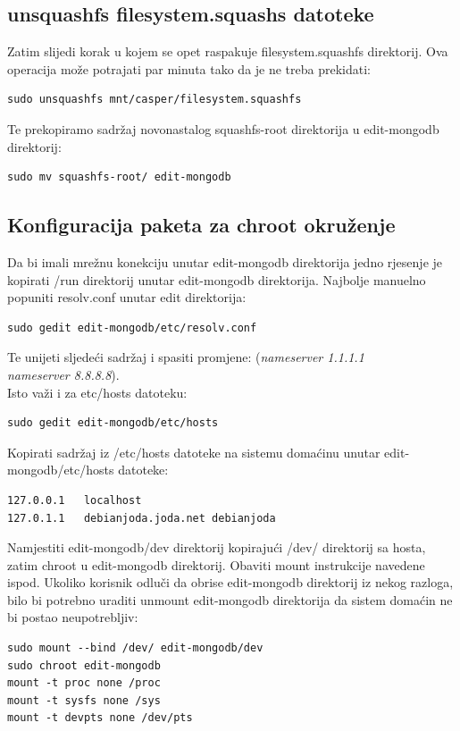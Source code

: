 \documentclass[12pt,vi]{mitthesis}
\begin{document}
\subsection*{unsquashfs filesystem.squashs datoteke}
\noindent
Zatim slijedi korak u kojem se opet raspakuje filesystem.squashfs direktorij. Ova operacija može potrajati par minuta tako da je ne treba prekidati:\\
\begin{lstlisting}[style=BashInputStyle]
sudo unsquashfs mnt/casper/filesystem.squashfs
\end{lstlisting}

Te prekopiramo sadržaj novonastalog squashfs-root direktorija u edit-mongodb direktorij:
\begin{lstlisting}[style=BashInputStyle]
sudo mv squashfs-root/ edit-mongodb
\end{lstlisting}

\subsection*{Konfiguracija paketa za chroot okruženje}
\noindent
Da bi imali mrežnu konekciju unutar edit-mongodb direktorija jedno rjesenje je kopirati /run direktorij unutar edit-mongodb direktorija.
Najbolje manuelno popuniti resolv.conf unutar edit direktorija:
\begin{lstlisting}[style=BashInputStyle]
sudo gedit edit-mongodb/etc/resolv.conf
\end{lstlisting}
Te unijeti sljedeći sadržaj i spasiti promjene:
(\textit{nameserver 1.1.1.1 \\
nameserver 8.8.8.8}).\\
\noindent
Isto važi i za etc/hosts datoteku:
\begin{lstlisting}[style=BashInputStyle]
sudo gedit edit-mongodb/etc/hosts
\end{lstlisting}
Kopirati sadržaj iz /etc/hosts datoteke na sistemu domaćinu unutar edit-mongodb/etc/hosts datoteke:
\begin{lstlisting}
127.0.0.1	localhost
127.0.1.1	debianjoda.joda.net	debianjoda
\end{lstlisting}
\noindent
Namjestiti edit-mongodb/dev direktorij kopirajući /dev/ direktorij sa hosta, zatim chroot u edit-mongodb direktorij.
Obaviti mount instrukcije navedene ispod. Ukoliko korisnik odluči da obrise edit-mongodb direktorij iz nekog razloga,
bilo bi potrebno uraditi unmount edit-mongodb direktorija da sistem domaćin ne bi postao neupotrebljiv:
\begin{lstlisting}[style=BashInputStyle]
sudo mount --bind /dev/ edit-mongodb/dev
sudo chroot edit-mongodb
mount -t proc none /proc
mount -t sysfs none /sys
mount -t devpts none /dev/pts
\end{lstlisting}
\end{document}
